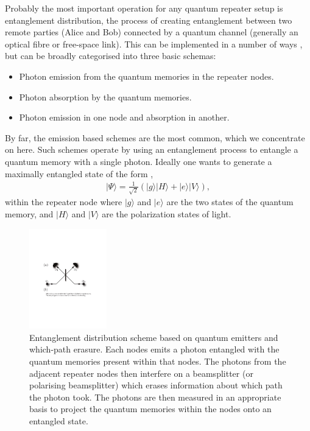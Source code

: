 \documentclass[twocolumn, aps, rmp, amsmath, amssymb, nofootinbib, superscriptaddress, longbibliography, floatfix, table-of-contents, eqsecnum]{revtex4-1}
\newcommand{\ket}[1]{|#1\rangle}
\begin{document}
Probably the most important operation for any quantum repeater setup is entanglement distribution, the process of creating entanglement between two remote parties (Alice and Bob) connected by a quantum channel (generally an optical fibre or free-space link). This can be implemented in a number of ways \cite{Bennett96, nk98, bennett93, SSRG09, childress06, loock06, munro08}, but can be broadly categorised into three basic schemas:
\begin{itemize}
\item Photon emission from the quantum memories in the repeater nodes.
\item Photon absorption by the quantum memories.
\item Photon emission in one node and absorption in another.
\end{itemize}
By far, the emission based schemes are the most common, which we concentrate on here. Such schemes operate by using an entanglement process to entangle a quantum memory with a single photon. Ideally one wants to generate a maximally entangled state of the form \cite{WJM2015},
\begin{align}
|\Psi\rangle=\frac{1}{\sqrt{2}} (|g\rangle |H\rangle + |e\rangle |V\rangle),
\end{align}
within the repeater node where $\ket{g}$ and $\ket{e}$ are the two states of the quantum memory, and $\ket{H}$ and $\ket{V}$ are the polarization states of light. 
\begin{figure}[!htb]
\includegraphics[width=0.3\textwidth]{repeaters_3}
\caption{Entanglement distribution scheme based on quantum emitters and which-path erasure. Each nodes emits a photon entangled with the quantum memories present within that nodes. The photons from the adjacent repeater nodes then interfere on a beamsplitter (or polarising beamsplitter) which erases information about which path the photon took. The photons are then measured in an appropriate basis to project the quantum memories within the nodes onto an entangled state.} 
\label{fig:repeaters_3}
\end{figure} 
\end{document}
